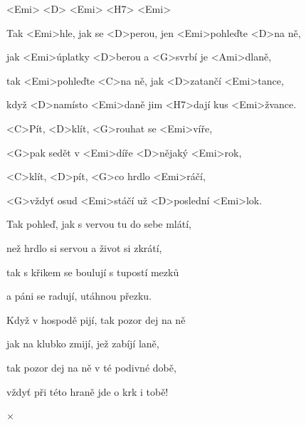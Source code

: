 

<Emi> <D> <Emi> <H7> <Emi>

\zs
Tak <Emi>hle, jak se <D>perou, jen <Emi>pohleďte <D>na ně,

jak <Emi>úplatky <D>berou a <G>svrbí je <Ami>dlaně,

tak <Emi>pohleďte <C>na ně, jak <D>zatančí <Emi>tance,

když <D>namísto <Emi>daně jim <H7>dají kus <Emi>žvance.
\ks

\zr
<C>Pít, <D>klít, <G>rouhat se <Emi>víře,

<G>pak sedět v <Emi>díře <D>nějaký <Emi>rok,

<C>klít, <D>pít, <G>co hrdlo <Emi>ráčí,

<G>vždyť osud <Emi>stáčí už <D>poslední <Emi>lok.
\kr

\zs
Tak pohleď, jak s vervou tu do sebe mlátí,

než hrdlo si servou a život si zkrátí,

tak s křikem se boulují s tupostí mezků

a páni se radují, utáhnou přezku.
\ks

\zr\kr

\zs
Když v hospodě pijí, tak pozor dej na ně

jak na klubko zmijí, jež zabíjí laně,

tak pozor dej na ně v té podivné době,

vždyť při této hraně jde o krk i tobě!
\ks

× \kr

\kp
